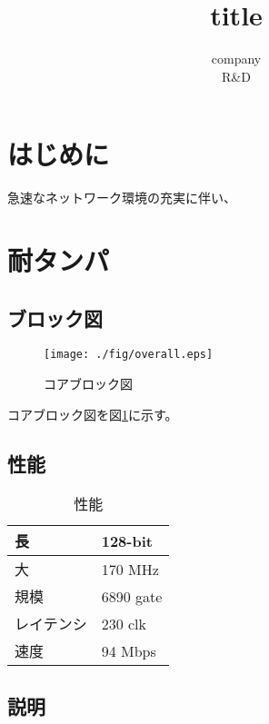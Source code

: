 \documentclass[11pt]{article}
\title{
\LARGE\msg title 
}
\author{
\normalsize company 
\\[-0.5pc]\normalsize R&D 
}
\begin{document}

\tableofcontents

\thispagestyle{empty}

\newpage
\section{はじめに}
\setcounter{page}{1}

急速なネットワーク環境の充実に伴い、

\section{耐タンパ}

\subsection{ブロック図}

\begin{figure}[!h]
\centering
\texttt{[image: ./fig/overall.eps]}
\vspace{-13pt}
\caption{コアブロック図}
\label{fig:overall}
\end{figure}

コアブロック図を図\ref{fig:overall}に示す。

\subsection{性能}

\begin{table}[!h]
\vspace{-13pt}
\caption{性能}
\label{tab:performance}
\centering
\vspace{5pt}
\begin{tabular}{|l|l|}
\hline
長 & 128-bit  \\
\hline
大 & 170 MHz  \\
\hline
規模 & 6890 gate \\
\hline
レイテンシ & 230 clk \\
\hline
速度 & 94 Mbps \\
\hline
\end{tabular}
\end{table}

\subsection{説明}
\end{document}
